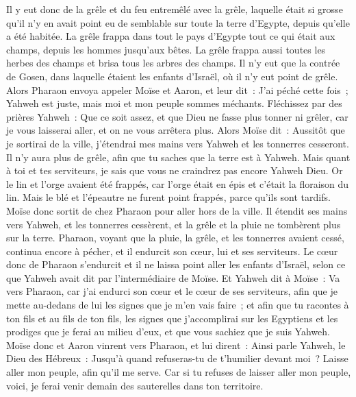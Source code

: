 \begin{multicols}{2}
Il y eut donc de la grêle et du feu entremêlé avec la grêle, laquelle était si grosse qu'il n'y en avait point eu de semblable sur toute la terre d'Egypte, depuis qu'elle a été habitée.
La grêle frappa dans tout le pays d'Egypte tout ce qui était aux champs, depuis les hommes jusqu'aux bêtes. La grêle frappa aussi toutes les herbes des champs et brisa tous les arbres des champs.
Il n'y eut que la contrée de Gosen, dans laquelle étaient les enfants d'Israël, où il n'y eut point de grêle.
Alors Pharaon envoya appeler Moïse et Aaron, et leur dit~: J'ai péché cette fois~; Yahweh est juste, mais moi et mon peuple sommes méchants.
Fléchissez par des prières Yahweh~: Que ce soit assez, et que Dieu ne fasse plus tonner ni grêler, car je vous laisserai aller, et on ne vous arrêtera plus.
Alors Moïse dit~: Aussitôt que je sortirai de la ville, j'étendrai mes mains vers Yahweh et les tonnerres cesseront. Il n'y aura plus de grêle, afin que tu saches que la terre est à Yahweh.
Mais quant à toi et tes serviteurs, je sais que vous ne craindrez pas encore Yahweh Dieu.
Or le lin et l'orge avaient été frappés, car l'orge était en épis et c'était la floraison du lin.
 Mais le blé et l'épeautre ne furent point frappés, parce qu'ils sont tardifs.
Moïse donc sortit de chez Pharaon pour aller hors de la ville. Il étendit ses mains vers Yahweh, et les tonnerres cessèrent, et la grêle et la pluie ne tombèrent plus sur la terre.
Pharaon, voyant que la pluie, la grêle, et les tonnerres avaient cessé, continua encore à pécher, et il endurcit son cœur, lui et ses serviteurs.
Le cœur donc de Pharaon s'endurcit et il ne laissa point aller les enfants d'Israël, selon ce que Yahweh avait dit par l'intermédiaire de Moïse.
\VerseOne{} Et Yahweh dit à Moïse~: Va vers Pharaon, car j'ai endurci son cœur et le cœur de ses serviteurs, afin que je mette au-dedans de lui les signes que je m'en vais faire~;
et afin que tu racontes à ton fils et au fils de ton fils, les signes que j'accomplirai sur les Egyptiens et les prodiges que je ferai au milieu d'eux, et que vous sachiez que je suis Yahweh.
Moïse donc et Aaron vinrent vers Pharaon, et lui dirent~: Ainsi parle Yahweh, le Dieu des Hébreux~: Jusqu'à quand refuseras-tu de t'humilier devant moi~? Laisse aller mon peuple, afin qu'il me serve.
Car si tu refuses de laisser aller mon peuple, voici, je ferai venir demain des sauterelles dans ton territoire.

\end{multicols}
